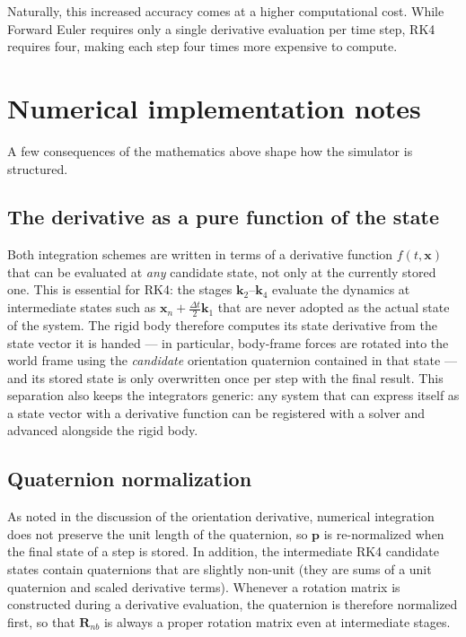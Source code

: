 \documentclass{article}
\begin{document}
Naturally, this increased accuracy comes at a higher computational cost. While Forward Euler requires only a single derivative evaluation per time step, RK4 requires four, making each step four times more expensive to compute.

\section{Numerical implementation notes}

A few consequences of the mathematics above shape how the simulator is structured.

\subsection{The derivative as a pure function of the state}

Both integration schemes are written in terms of a derivative function $f(t, \mathbf{x})$ that can be evaluated at \emph{any} candidate state, not only at the currently stored one. This is essential for RK4: the stages $\mathbf{k}_2$--$\mathbf{k}_4$ evaluate the dynamics at intermediate states such as $\mathbf{x}_n + \frac{\Delta t}{2}\mathbf{k}_1$ that are never adopted as the actual state of the system. The rigid body therefore computes its state derivative from the state vector it is handed --- in particular, body-frame forces are rotated into the world frame using the \emph{candidate} orientation quaternion contained in that state --- and its stored state is only overwritten once per step with the final result. This separation also keeps the integrators generic: any system that can express itself as a state vector with a derivative function can be registered with a solver and advanced alongside the rigid body.

\subsection{Quaternion normalization}

As noted in the discussion of the orientation derivative, numerical integration does not preserve the unit length of the quaternion, so $\mathbf{p}$ is re-normalized when the final state of a step is stored. In addition, the intermediate RK4 candidate states contain quaternions that are slightly non-unit (they are sums of a unit quaternion and scaled derivative terms). Whenever a rotation matrix is constructed during a derivative evaluation, the quaternion is therefore normalized first, so that $\mathbf{R}_{nb}$ is always a proper rotation matrix even at intermediate stages.
\end{document}
